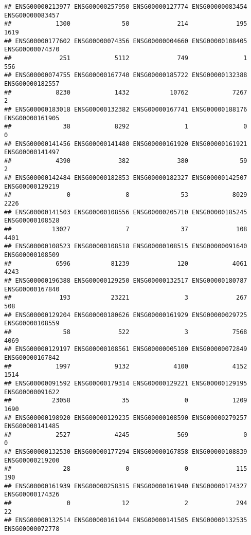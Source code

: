 \documentclass[
]{article}
\begin{document}
\begin{verbatim}
## ENSG00000213977 ENSG00000257950 ENSG00000127774 ENSG00000083454 ENSG00000083457 
##            1300              50             214             195            1619 
## ENSG00000177602 ENSG00000074356 ENSG00000004660 ENSG00000108405 ENSG00000074370 
##             251            5112             749               1             556 
## ENSG00000074755 ENSG00000167740 ENSG00000185722 ENSG00000132388 ENSG00000182557 
##            8230            1432           10762            7267               2 
## ENSG00000183018 ENSG00000132382 ENSG00000167741 ENSG00000188176 ENSG00000161905 
##              38            8292               1               0               0 
## ENSG00000141456 ENSG00000141480 ENSG00000161920 ENSG00000161921 ENSG00000141497 
##            4390             382             380              59               2 
## ENSG00000142484 ENSG00000182853 ENSG00000182327 ENSG00000142507 ENSG00000129219 
##               0               8              53            8029            2226 
## ENSG00000141503 ENSG00000108556 ENSG00000205710 ENSG00000185245 ENSG00000108528 
##           13027               7              37             108            4401 
## ENSG00000108523 ENSG00000108518 ENSG00000108515 ENSG00000091640 ENSG00000108509 
##            6596           81239             120            4061            4243 
## ENSG00000196388 ENSG00000129250 ENSG00000132517 ENSG00000180787 ENSG00000167840 
##             193           23221               3             267             508 
## ENSG00000129204 ENSG00000180626 ENSG00000161929 ENSG00000029725 ENSG00000108559 
##              58             522               3            7568            4069 
## ENSG00000129197 ENSG00000108561 ENSG00000005100 ENSG00000072849 ENSG00000167842 
##            1997            9132            4100            4152            1514 
## ENSG00000091592 ENSG00000179314 ENSG00000129221 ENSG00000129195 ENSG00000091622 
##           23058              35               0            1209            1690 
## ENSG00000198920 ENSG00000129235 ENSG00000108590 ENSG00000279257 ENSG00000141485 
##            2527            4245             569               0               0 
## ENSG00000132530 ENSG00000177294 ENSG00000167858 ENSG00000108839 ENSG00000219200 
##              28               0               0             115             190 
## ENSG00000161939 ENSG00000258315 ENSG00000161940 ENSG00000174327 ENSG00000174326 
##               0              12               2             294              22 
## ENSG00000132514 ENSG00000161944 ENSG00000141505 ENSG00000132535 ENSG00000072778 

\end{verbatim}
\end{document}
